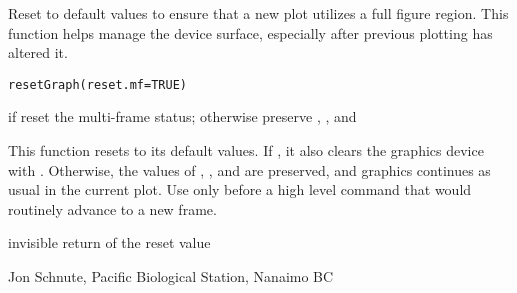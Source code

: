 \documentclass[letterpaper]{book}
\begin{document}
\begin{Description}\relax
Reset  to default values to ensure that a new plot 
utilizes a full figure region. This function helps manage the device 
surface, especially after previous plotting has altered it.
\end{Description}
\begin{Usage}
\begin{verbatim}resetGraph(reset.mf=TRUE)\end{verbatim}
\end{Usage}
\begin{Arguments}
\begin{ldescription}
\item[\code{reset.mf}] if  reset the multi-frame status; otherwise
preserve , , and 
\end{ldescription}
\end{Arguments}
\begin{Details}\relax
This function resets  to its default values.
If , it also clears the graphics device with 
. Otherwise, the values of , , 
and  are preserved, and graphics continues as usual in
the current plot. Use  only before a high level
command that would routinely advance to a new frame.
\end{Details}
\begin{Value}
invisible return of the reset value 
\end{Value}
\begin{Author}\relax
Jon Schnute, Pacific Biological Station, Nanaimo BC
\end{Author}
\end{document}
